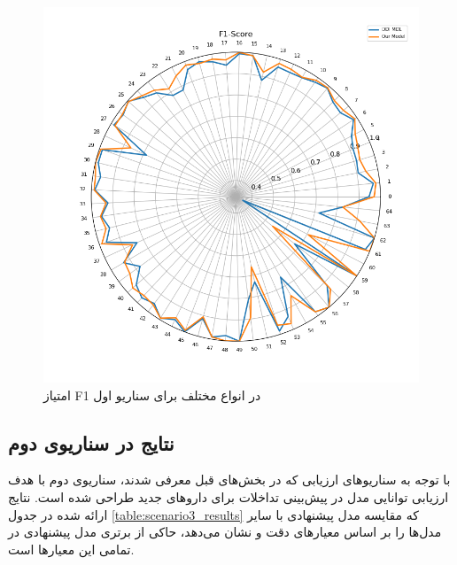 \begin{figure}[t]
	\centering
	\includegraphics[width=\textwidth]{images/s2-f1-score.png}
	\caption{ امتیاز F1 در انواع مختلف برای سناریو اول }
	\label{fig:s2_f1_score}
\end{figure}

\subsection{نتایج در سناریوی دوم}

با توجه به سناریوهای ارزیابی که در بخش‌های قبل‌ معرفی شدند، سناریوی دوم با هدف ارزیابی توانایی مدل در پیش‌بینی تداخلات برای داروهای جدید طراحی شده است. نتایج ارائه شده در جدول \ref{table:scenario3_results} که مقایسه مدل پیشنهادی با سایر مدل‌ها را بر اساس معیارهای دقت و  نشان می‌دهد، حاکی از برتری مدل پیشنهادی در تمامی این معیارها است.

